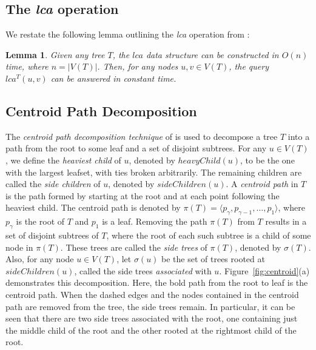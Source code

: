 \documentclass[final,1p,times]{elsarticle}
\newtheorem{lemma}[theorem]{Lemma}
\begin{document}
    \subsection{The \textit{lca} operation}

    We restate the following lemma outlining the \textit{lca} operation from \cite{bender2000lca}:

    \begin{lemma}
        \label{lem:lca}
        Given any tree $T$, the $lca$ data structure can be constructed in $O(n)$ time, where $n = |V(T)|$. Then, for any nodes $u, v \in V(T)$, the query $lca^{T}(u, v)$ can be answered in constant time.
    \end{lemma}





    \subsection{Centroid Path Decomposition}

    The \textit{centroid path decomposition technique} of \cite{cole2000n} is used to decompose a tree $T$ into a path from the root to some leaf and a set of disjoint subtrees. For any $u \in V(T)$, we define the \textit{heaviest child} of $u$, denoted by $heavyChild(u)$, to be the one with the largest leafset, with ties broken arbitrarily. The remaining children are called the \textit{side children} of $u$, denoted by $sideChildren(u)$. A \textit{centroid path} in $T$ is the path formed by starting at the root and at each point following the heaviest child. The centroid path is denoted by $\pi(T) = \langle p_{\gamma}, p_{\gamma - 1}, \ldots, p_1 \rangle$, where $p_{\gamma}$ is the root of $T$ and $p_1$ is a leaf. Removing the path $\pi(T)$ from $T$ results in a set of disjoint subtrees of $T$, where the root of each such subtree is a child of some node in $\pi(T)$. These trees are called the \textit{side trees} of $\pi(T)$, denoted by $\sigma(T)$. Also, for any node $u \in V(T)$, let $\sigma(u)$ be the set of trees rooted at $sideChildren(u)$, called the side trees \textit{associated} with $u$. Figure~\ref{fig:centroid}(a) demonstrates this decomposition. Here, the bold path from the root to leaf is the centroid path. When the dashed edges and the nodes contained in the centroid path are removed from the tree, the side trees remain. In particular, it can be seen that there are two side trees associated with the root, one containing just the middle child of the root and the other rooted at the rightmost child of the root.
\end{document}
